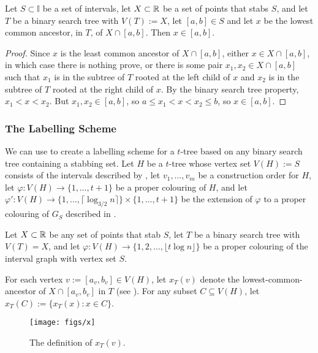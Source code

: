 \documentclass[kpfonts]{patmorin}
\begin{document}
\begin{lem}
  Let $S\subset\mathbb{I}$ be a set of intervals, let $X\subset\mathbb{R}$ be a set of points that stabs $S$, and let $T$ be a binary search tree with $V(T):=X$, let $[a,b]\in S$ and let $x$ be the lowest common ancestor, in $T$, of $X\cap [a,b]$.  Then $x\in [a,b]$.
\end{lem}

\begin{proof}
  Since $x$ is the least common ancestor of $X\cap[a,b]$, either $x\in X\cap[a,b]$, in which case there is nothing prove, or there is some pair $x_1,x_2\in X\cap[a,b]$ such that $x_1$ is in the subtree of $T$ rooted at the left child of $x$ and $x_2$ is in the subtree of $T$ rooted at the right child of $x$.  By the binary search tree property, $x_1<x<x_2$. But $x_1,x_2 \in [a,b]$, so $a\le x_1<x<x_2\le b$, so $x\in [a,b]$.  
\end{proof}

\subsubsection{The Labelling Scheme}

We can use  to create a labelling scheme for a $t$-tree based on any binary search tree containing a stabbing set.  Let $H$ be a $t$-tree whose vertex set $V(H):=S$ consists of the intervals described by , let $v_1,\ldots,v_m$ be a construction order for $H$, let $\varphi:V(H)\to\{1,\ldots,t+1\}$ be a proper colouring of $H$, and let $\varphi':V(H)\to\{1,\ldots,\lceil\log_{3/2} n\rceil\}\times\{1,\ldots,t+1\}$ be the extension of $\varphi$ to a proper colouring of $G_S$ described in .

Let $X\subset\mathbb{R}$ be any set of points that stab $S$, let $T$ be a binary search tree with $V(T)=X$, and let $\varphi:V(H)\to\{1,2,\ldots,\lfloor t\log n\rfloor\}$ be a proper colouring of the interval graph with vertex set $S$.

For each vertex $v:=[a_v,b_v]\in V(H)$, let $x_T(v)$ denote the lowest-common-ancestor of $X\cap [a_v,b_v]$ in $T$ (see ).  For any subset $C\subseteq V(H)$, let $x_T(C):=\{x_T(x):x\in C\}$.  

\begin{figure}
  \begin{center}
    \texttt{[image: figs/x]}
  \end{center}
  \caption{The definition of $x_T(v)$.}
\end{figure}
\end{document}

